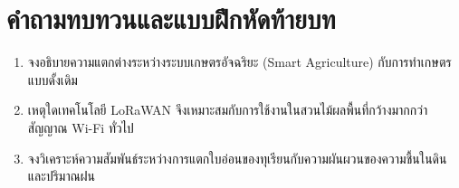 \section{คำถามทบทวนและแบบฝึกหัดท้ายบท}
\begin{enumerate}
    \item จงอธิบายความแตกต่างระหว่างระบบเกษตรอัจฉริยะ (Smart Agriculture) กับการทำเกษตรแบบดั้งเดิม
    \item เหตุใดเทคโนโลยี LoRaWAN จึงเหมาะสมกับการใช้งานในสวนไม้ผลพื้นที่กว้างมากกว่าสัญญาณ Wi-Fi ทั่วไป
    \item จงวิเคราะห์ความสัมพันธ์ระหว่างการแตกใบอ่อนของทุเรียนกับความผันผวนของความชื้นในดินและปริมาณฝน
\end{enumerate}
